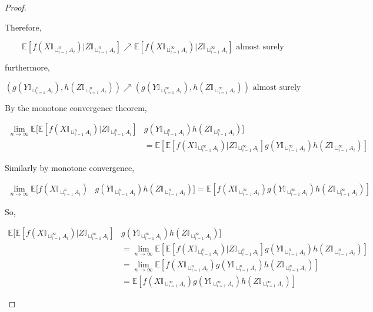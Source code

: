 \documentclass[12pt]{article}
\newcommand{\mb}{\mathbb}
\newcommand{\ra}{\rightarrow}
\newcommand{\te}{\text}
\newcommand{\ex}[1]{\mb{E}\left[#1\right]}			%
\newcommand{\X}{X}								%
\newcommand{\indx}[1]{_{#1}}					%
\newcommand{\XX}{Y}								%
\newcommand{\XXX}{Z}							%
\newcommand{\typset}{A}							%
\begin{document}
\begin{proof}
\begin{enumerate}[(a)]
Therefore,

\[\ex{f(\X\mb{I}_{\sqcup_{i=1}^n \typset\indx{i}})|\XXX\mb{I}_{\sqcup_{i=1}^n \typset\indx{i}}} \nearrow \ex{f(\X\mb{I}_{\sqcup_{i=1}^\infty \typset\indx{i}})|\XXX\mb{I}_{\sqcup_{i=1}^\infty \typset\indx{i}}} \te{ almost surely}\]

furthermore, 

\[(g(\XX\mb{I}_{\sqcup_{i=1}^n \typset\indx{i}}),h(\XXX\mb{I}_{\sqcup_{i=1}^n \typset\indx{i}})) \nearrow (g(\XX\mb{I}_{\sqcup_{i=1}^\infty \typset\indx{i}}),h(\XXX\mb{I}_{\sqcup_{i=1}^\infty  \typset\indx{i}})) \te{ almost surely}\]

By the monotone convergence theorem,

\begin{align*}
\lim_{n\ra\infty} \mb{E}\bigg[\ex{f(\X\mb{I}_{\sqcup_{i=1}^n \typset\indx{i}})|\XXX\mb{I}_{\sqcup_{i=1}^n \typset\indx{i}}}&g(\XX\mb{I}_{\sqcup_{i=1}^n \typset\indx{i}})h(\XXX\mb{I}_{\sqcup_{i=1}^n \typset\indx{i}})\bigg]\\
& = \ex{\ex{f(\X\mb{I}_{\sqcup_{i=1}^\infty \typset\indx{i}})|\XXX\mb{I}_{\sqcup_{i=1}^\infty \typset\indx{i}}}g(\XX\mb{I}_{\sqcup_{i=1}^\infty \typset\indx{i}})h(\XXX\mb{I}_{\sqcup_{i=1}^\infty \typset\indx{i}})}
\end{align*}

Similarly by monotone convergence,

\begin{align*}
\lim_{n\ra\infty} \mb{E}\bigg[f(\X\mb{I}_{\sqcup_{i=1}^n \typset\indx{i}})&g(\XX\mb{I}_{\sqcup_{i=1}^n \typset\indx{i}})h(\XXX\mb{I}_{\sqcup_{i=1}^n \typset\indx{i}})\bigg] = \ex{f(\X\mb{I}_{\sqcup_{i=1}^\infty \typset\indx{i}})g(\XX\mb{I}_{\sqcup_{i=1}^\infty \typset\indx{i}})h(\XXX\mb{I}_{\sqcup_{i=1}^\infty \typset\indx{i}})}
\end{align*}

So,

\begin{align*}
\mb{E}\bigg[\ex{f(\X\mb{I}_{\sqcup_{i=1}^\infty \typset\indx{i}})|\XXX\mb{I}_{\sqcup_{i=1}^\infty \typset\indx{i}}}&g(\XX\mb{I}_{\sqcup_{i=1}^\infty \typset\indx{i}})h(\XXX\mb{I}_{\sqcup_{i=1}^\infty \typset\indx{i}})\bigg]\\
&= \lim_{n\ra\infty} \ex{\ex{f(\X\mb{I}_{\sqcup_{i=1}^n \typset\indx{i}})|\XXX\mb{I}_{\sqcup_{i=1}^n \typset\indx{i}}}g(\XX\mb{I}_{\sqcup_{i=1}^n \typset\indx{i}})h(\XXX\mb{I}_{\sqcup_{i=1}^n \typset\indx{i}})}\\
&= \lim_{n\ra\infty} \ex{f(\X\mb{I}_{\sqcup_{i=1}^n \typset\indx{i}})g(\XX\mb{I}_{\sqcup_{i=1}^n \typset\indx{i}})h(\XXX\mb{I}_{\sqcup_{i=1}^n \typset\indx{i}})}\\
&= \ex{f(\X\mb{I}_{\sqcup_{i=1}^\infty \typset\indx{i}})g(\XX\mb{I}_{\sqcup_{i=1}^\infty \typset\indx{i}})h(\XXX\mb{I}_{\sqcup_{i=1}^\infty \typset\indx{i}})}
\end{align*}


\end{enumerate}
\end{proof}
\end{document}
